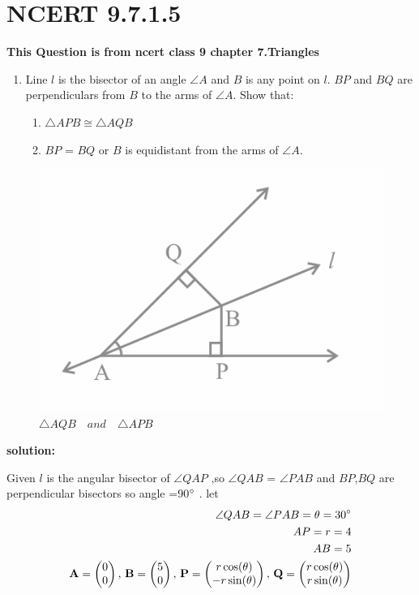 \documentclass[11pt]{book}
\begin{document}
\section*{NCERT 9.7.1.5}
\textbf{This Question is from ncert class 9  chapter 7.Triangles }
\begin{enumerate}
    \item Line $l$ is the bisector of an angle $\angle A$ and $B$ is any point on $l$. $BP$ and $BQ$ are perpendiculars from $B$ to the arms of $\angle A$. Show that:
%
\begin{enumerate}
    \item $\triangle  APB \cong \triangle AQB$  
    \item $BP$ = $BQ$ or $B$ is equidistant from the arms of $\angle A$.
 
\end{enumerate}
\end{enumerate}

\begin{figure}[H]
    \centering
    \includegraphics[width=\columnwidth]{figs/fig_mc.png}
    \caption{$\triangle AQB \hspace{12pt} and \hspace{12pt} \triangle APB$}
\end{figure}

\textbf{solution:}

Given $l$ is the angular bisector of $\angle QAP$ ,so $\angle QAB $ = $\angle PAB $ 
and $BP$,$BQ$ are perpendicular bisectors so angle =90$\degree$ .
%
let 
\begin{align}
	\angle QAB  = \angle PAB  =\theta = 30 \degree \\
	AP = r =4 \\
	AB = 5 \\
	\mathbf{A} = \begin{pmatrix}0 \\ 0\end{pmatrix} ,\,
	\mathbf{B} = \begin{pmatrix}5 \\ 0\end{pmatrix} ,\,
	\mathbf{P} = \begin{pmatrix}r\cos(\theta) \\ -r\sin(\theta)\end{pmatrix} ,\,
	\mathbf{Q} = \begin{pmatrix}r\cos(\theta) \\ r\sin(\theta)\end{pmatrix} \\
\end{align}
\end{document}
